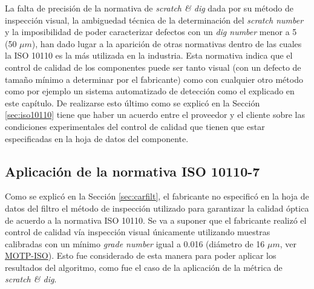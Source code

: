  La falta de precisión de la normativa de \textit{scratch \& dig} dada por su método de inspección visual, la ambiguedad técnica de la determinación del \textit{scratch number} y la imposibilidad de poder caracterizar defectos con un \textit{dig number} menor a 5 (50 $\mu m$), han dado lugar a la aparición de otras normativas dentro de las cuales la ISO 10110 es la más utilizada en la industria. Esta normativa indica que el control de calidad de los componentes puede ser tanto visual (con un defecto de tamaño mínimo a determinar por el fabricante) como con cualquier otro método como por ejemplo un sistema automatizado de detección como el explicado en este capítulo. De realizarse esto último como se explicó en la Sección \ref{sec:iso10110} tiene que haber un acuerdo entre el proveedor y el cliente sobre las condiciones experimentales del control de calidad que tienen que estar especificadas en la hoja de datos del componente.
 
\singlespacing
\subsection{Aplicación de la normativa ISO 10110-7}
\label{sec:apiso}

\hspace{0.5cm}Como se explicó en la Sección \ref{sec:carfilt}, el fabricante no especificó en la hoja de datos del filtro el método de inspección utilizado para garantizar la calidad óptica de acuerdo a la normativa ISO 10110. Se va a suponer que el fabricante realizó el control de calidad vía inspección visual únicamente utilizando muestras calibradas con un mínimo \textit{grade number} igual a 0.016 (diámetro de 16 $\mu m$, ver \href{https://www.thorlabs.com/thorproduct.cfm?partnumber=MOTP-ISO}{MOTP-ISO}). Esto fue considerado de esta manera para poder aplicar los resultados del algoritmo, como fue el caso de la aplicación de la métrica de \textit{scratch \& dig}.

